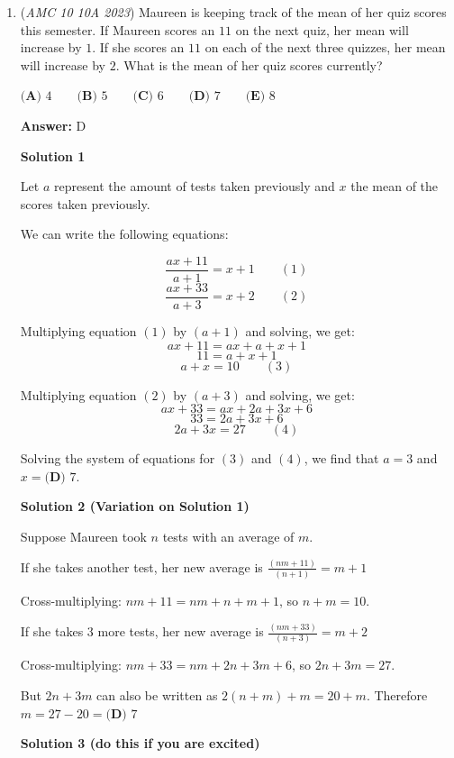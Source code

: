 \begin{enumerate}
 


 


 


	\item (\textit{AMC 10 10A 2023}) Maureen is keeping track of the mean of her quiz scores this semester. If Maureen scores an $11$ on the next quiz, her mean will increase by $1$. If she scores an $11$ on each of the next three quizzes, her mean will increase by $2$. What is the mean of her quiz scores currently? 


 $\textbf{(A) }4\qquad\textbf{(B) }5\qquad\textbf{(C) }6\qquad\textbf{(D) }7\qquad\textbf{(E) }8$

 \textbf{Answer: }D



\textbf{Solution 1}

Let $a$ represent the amount of tests taken previously and $x$ the mean of the scores taken previously. 

 We can write the following equations:

 
 \[\frac{ax+11}{a+1}=x+1\qquad (1)\]
 \[\frac{ax+33}{a+3}=x+2\qquad (2)\]

 Multiplying equation $(1)$ by $(a+1)$ and solving, we get:
 \[ax+11=ax+a+x+1\]
 \[11=a+x+1\]
 \[a+x=10\qquad (3)\]

 Multiplying equation $(2)$ by $(a+3)$ and solving, we get:
 \[ax+33=ax+2a+3x+6\]
 \[33=2a+3x+6\]
 \[2a+3x=27\qquad (4)\]

 Solving the system of equations for $(3)$ and $(4)$, we find that $a=3$ and $x=\boxed{\textbf{(D) }7}$.

 



\textbf{Solution 2 (Variation on Solution 1)}

Suppose Maureen took $n$ tests with an average of $m$.

 If she takes another test, her new average is $\frac{(nm+11)}{(n+1)}=m+1$

 Cross-multiplying: $nm+11=nm+n+m+1$, so $n+m=10$.

 If she takes $3$ more tests, her new average is $\frac{(nm+33)}{(n+3)}=m+2$

 Cross-multiplying: $nm+33=nm+2n+3m+6$, so $2n+3m=27$.

 But $2n+3m$ can also be written as $2(n+m)+m=20+m$. Therefore $m=27-20=\boxed{\textbf{(D) }7}$




\textbf{Solution 3 (do this if you are excited)}


\end{enumerate}
